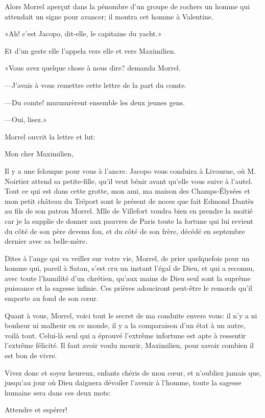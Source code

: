 Alors Morrel aperçut dans la pénombre d'un groupe de rochers un homme qui attendait un signe pour avancer; il montra cet homme à Valentine. 

«Ah! c'est Jacopo, dit-elle, le capitaine du yacht.» 

Et d'un geste elle l'appela vers elle et vers Maximilien. 

«Vous avez quelque chose à nous dire? demanda Morrel. 

—J'avais à vous remettre cette lettre de la part du comte. 

—Du comte! murmurèrent ensemble les deux jeunes gens. 

—Oui, lisez.» 

Morrel ouvrit la lettre et lut: 

\begin{mail}{}{Mon cher Maximilien,}

Il y a une felouque pour vous à l'ancre. Jacopo vous conduira à Livourne, où M. Noirtier attend sa petite-fille, qu'il veut bénir avant qu'elle vous suive à l'autel. Tout ce qui est dans cette grotte, mon ami, ma maison des Champs-Élysées et mon petit château du Tréport sont le présent de noces que fait Edmond Dantès au fils de son patron Morrel. Mlle de Villefort voudra bien en prendre la moitié car je la supplie de donner aux pauvres de Paris toute la fortune qui lui revient du côté de son père devenu fou, et du côté de son frère, décédé en septembre dernier avec sa belle-mère. 

Dites à l'ange qui va veiller sur votre vie, Morrel, de prier quelquefois pour un homme qui, pareil à Satan, s'est cru un instant l'égal de Dieu, et qui a reconnu, avec toute l'humilité d'un chrétien, qu'aux mains de Dieu seul sont la suprême puissance et la sagesse infinie. Ces prières adouciront peut-être le remords qu'il emporte au fond de son cœur. 

Quant à vous, Morrel, voici tout le secret de ma conduite envers vous: il n'y a ni bonheur ni malheur en ce monde, il y a la comparaison d'un état à un autre, voilà tout. Celui-là seul qui a éprouvé l'extrême infortune est apte à ressentir l'extrême félicité. Il faut avoir voulu mourir, Maximilien, pour savoir combien il est bon de vivre. 

Vivez donc et soyez heureux, enfants chéris de mon cœur, et n'oubliez jamais que, jusqu'au jour où Dieu daignera dévoiler l'avenir à l'homme, toute la sagesse humaine sera dans ces deux mots: 

Attendre et espérer! 

\end{mail}

